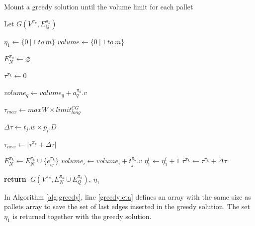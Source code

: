\documentclass[preprint,authoryear]{elsarticle}
\renewcommand{\Return}{\State \bf {return}~}
\begin{document}
\begin{algorithm}[H]
	\caption{Mount a greedy solution until the volume limit for each pallet}  \label{alg:greedy}
	
	\begin{algorithmic}[1]
		
		
		\State Let $G(V^{\pi_k}, E_Q^{\pi_k})$
		
		\State $\eta_1 \gets \{0\ |\ 1\ to\ m \}$ \label{greedy:eta}
		\State $volume \gets \{0\ |\ 1\ to\ m \}$
		
	
		\State $E_N^{\pi_k} \gets \varnothing$ 
		
		\State $\tau^{\pi_k} \gets 0$	 	
		
		\State $volume_q \gets volume_q + a_q^{\pi_k}.v$ 
		\EndIf		
		\EndFor
		
		\State $\tau_{max} \gets maxW \times limit^{CG}_{long}$ 
		
		
		\State $\Delta\tau \gets t_j.w \times p_i.D$
		
		\State $\tau_{new} \gets | \tau^{\pi_k} + \Delta\tau |$
		
		 \label{greedy:ts}
				 
			\State $E_N^{\pi_k} \gets E_N^{\pi_k} \cup \{e_{ij}^{\pi_k}\}$ 
			\State $volume_i \gets volume_i + t_j^{\pi_k}.v$
			\State $\eta_1^i \gets \eta_1^i + 1$ 
			\State $\tau^{\pi_k} \gets \tau^{\pi_k} + \Delta\tau$
			
		\EndIf
		\EndFor {}
		
		\Return $G(V^{\pi_k}, E_N^{\pi_k} \cup E_Q^{\pi_k}),\ \eta_1$
		
		\EndProcedure
		
	\end{algorithmic}
\end{algorithm}

In Algorithm \ref{alg:greedy}, line \ref{greedy:eta} defines an array with the same size as pallets array to save the set of last edges inserted in the greedy solution. The set $\eta_1$ is returned together with the greedy solution.
\end{document}
